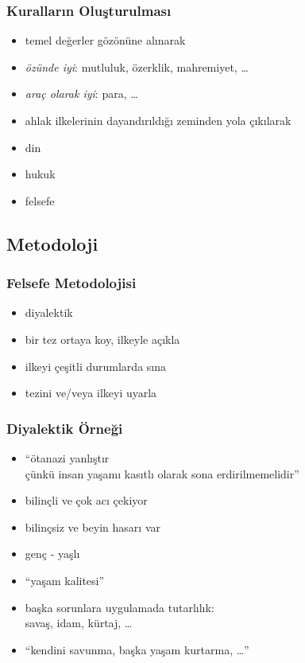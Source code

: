 \documentclass[dvipsnames]{beamer}
\theoremstyle{plain}
\begin{document}
\begin{frame}
  \frametitle{Kuralların Oluşturulması}

  \begin{itemize}
    \item \alert{temel değerler} gözönüne alınarak
    \item \emph{özünde iyi}: mutluluk, özerklik, mahremiyet, \ldots
    \item \emph{araç olarak iyi}: para, \ldots

    \pause
    \bigskip
    \item ahlak ilkelerinin dayandırıldığı zeminden yola çıkılarak
    \item din
    \item hukuk
    \item felsefe
  \end{itemize}
\end{frame}

\subsection{Metodoloji}

\begin{frame}
  \frametitle{Felsefe Metodolojisi}

  \begin{itemize}
    \item \alert{diyalektik}

    \medskip
    \item bir tez ortaya koy, ilkeyle açıkla
    \item ilkeyi çeşitli durumlarda sına
    \item tezini ve/veya ilkeyi uyarla
  \end{itemize}
\end{frame}

\begin{frame}
  \frametitle{Diyalektik Örneği}

  \begin{itemize}
    \item ``ötanazi yanlıştır\\
      çünkü insan yaşamı kasıtlı olarak sona erdirilmemelidir''

    \pause
    \medskip
    \item bilinçli ve çok acı çekiyor
    \item bilinçsiz ve beyin hasarı var
    \item genç - yaşlı

    \pause
    \smallskip
    \item ``yaşam kalitesi''

    \pause
    \medskip
    \item başka sorunlara uygulamada tutarlılık:\\
      savaş, idam, kürtaj, \ldots
    \item ``kendini savunma, başka yaşam kurtarma, \ldots''
  \end{itemize}
\end{frame}
\end{document}
